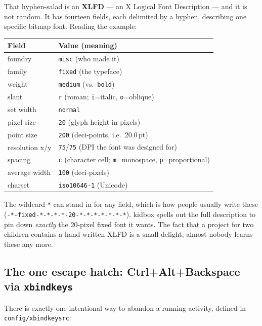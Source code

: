 \documentclass[11pt,oneside]{article}
\newcommand{\file}[1]{\textcolor{kbteal}{\texttt{#1}}}
\begin{document}
\begin{deeper}
That hyphen-salad is an \textbf{XLFD} --- an X Logical Font Description --- and it
is not random. It has fourteen fields, each delimited by a hyphen, describing one
specific bitmap font. Reading the example:

\smallskip
\begin{tabular}{@{}ll@{}}
\toprule
\textbf{Field} & \textbf{Value (meaning)}\\
\midrule
foundry        & \texttt{misc} (who made it)\\
family         & \texttt{fixed} (the typeface)\\
weight         & \texttt{medium} (vs.\ \texttt{bold})\\
slant          & \texttt{r} (roman; \texttt{i}=italic, \texttt{o}=oblique)\\
set width      & \texttt{normal}\\
pixel size     & \texttt{20} (glyph height in pixels)\\
point size     & \texttt{200} (deci-points, i.e.\ 20.0\,pt)\\
resolution x/y & \texttt{75}/\texttt{75} (DPI the font was designed for)\\
spacing        & \texttt{c} (character cell; \texttt{m}=monospace, \texttt{p}=proportional)\\
average width  & \texttt{100} (deci-pixels)\\
charset        & \texttt{iso10646-1} (Unicode)\\
\bottomrule
\end{tabular}
\smallskip

The wildcard \texttt{*} can stand in for any field, which is how people usually
write these (\texttt{-*-fixed-*-*-*-*-20-*-*-*-*-*-*-*}). kidbox spells out the
full description to pin down \emph{exactly} the 20-pixel fixed font it wants. The
fact that a project for two children contains a hand-written XLFD is a small
delight; almost nobody learns these any more.
\end{deeper}

\subsection{The one escape hatch: Ctrl+Alt+Backspace via \texttt{xbindkeys}}

There is exactly one intentional way to abandon a running activity, defined in
\file{config/xbindkeysrc}:
\end{document}
